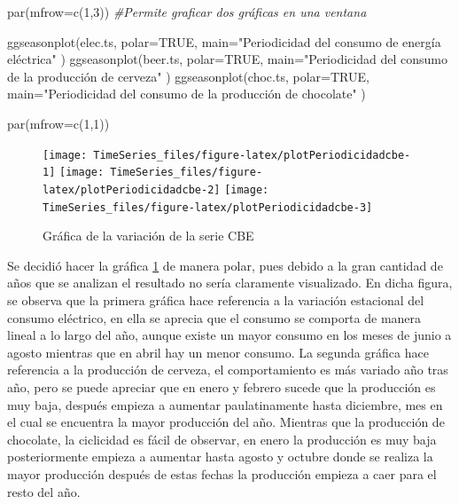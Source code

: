 \documentclass[
  spanish,
]{book}
\newenvironment{Shaded}{\begin{snugshade}}{\end{snugshade}}
\newcommand{\AttributeTok}[1]{\textcolor[rgb]{0.77,0.63,0.00}{#1}}
\newcommand{\CommentTok}[1]{\textcolor[rgb]{0.56,0.35,0.01}{\textit{#1}}}
\newcommand{\ConstantTok}[1]{\textcolor[rgb]{0.00,0.00,0.00}{#1}}
\newcommand{\DecValTok}[1]{\textcolor[rgb]{0.00,0.00,0.81}{#1}}
\newcommand{\FunctionTok}[1]{\textcolor[rgb]{0.00,0.00,0.00}{#1}}
\newcommand{\NormalTok}[1]{#1}
\newcommand{\StringTok}[1]{\textcolor[rgb]{0.31,0.60,0.02}{#1}}
\theoremstyle{remark}
\begin{document}
\begin{Shaded}
\begin{Highlighting}[]
\FunctionTok{par}\NormalTok{(}\AttributeTok{mfrow=}\FunctionTok{c}\NormalTok{(}\DecValTok{1}\NormalTok{,}\DecValTok{3}\NormalTok{)) }\CommentTok{\#Permite graficar dos gráficas en una ventana}


\FunctionTok{ggseasonplot}\NormalTok{(elec.ts,}
             \AttributeTok{polar=}\ConstantTok{TRUE}\NormalTok{, }
             \AttributeTok{main=}\StringTok{"Periodicidad del consumo de energía eléctrica"}\NormalTok{ )}
\FunctionTok{ggseasonplot}\NormalTok{(beer.ts,}
             \AttributeTok{polar=}\ConstantTok{TRUE}\NormalTok{, }
             \AttributeTok{main=}\StringTok{"Periodicidad del consumo de la producción de cerveza"}\NormalTok{ )}
\FunctionTok{ggseasonplot}\NormalTok{(choc.ts,}
             \AttributeTok{polar=}\ConstantTok{TRUE}\NormalTok{, }
             \AttributeTok{main=}\StringTok{"Periodicidad del consumo de la producción de chocolate"}\NormalTok{ )}


\FunctionTok{par}\NormalTok{(}\AttributeTok{mfrow=}\FunctionTok{c}\NormalTok{(}\DecValTok{1}\NormalTok{,}\DecValTok{1}\NormalTok{))}
\end{Highlighting}
\end{Shaded}

\begin{figure}

{\centering \texttt{[image: TimeSeries\_files/figure-latex/plotPeriodicidadcbe-1]} \texttt{[image: TimeSeries\_files/figure-latex/plotPeriodicidadcbe-2]} \texttt{[image: TimeSeries\_files/figure-latex/plotPeriodicidadcbe-3]} 

}

\caption{Gráfica de la variación de la serie CBE}\label{fig:plotPeriodicidadcbe}
\end{figure}

Se decidió hacer la gráfica \ref{fig:plotPeriodicidadcbe} de manera polar, pues debido a la gran cantidad de años que se analizan el resultado no sería claramente visualizado. En dicha figura, se observa que la primera gráfica hace referencia a la variación estacional del consumo eléctrico, en ella se aprecia que el consumo se comporta de manera lineal a lo largo del año, aunque existe un mayor consumo en los meses de junio a agosto mientras que en abril hay un menor consumo. La segunda gráfica hace referencia a la producción de cerveza, el comportamiento es más variado año tras año, pero se puede apreciar que en enero y febrero sucede que la producción es muy baja, después empieza a aumentar paulatinamente hasta diciembre, mes en el cual se encuentra la mayor producción del año. Mientras que la producción de chocolate, la ciclicidad es fácil de observar, en enero la producción es muy baja posteriormente empieza a aumentar hasta agosto y octubre donde se realiza la mayor producción después de estas fechas la producción empieza a caer para el resto del año.
\end{document}
